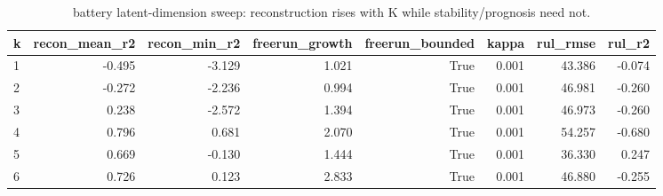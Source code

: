 \begin{table}[t]
\centering
\caption{battery latent-dimension sweep: reconstruction rises with K while stability/prognosis need not.}
\label{tab:battery_ksweep}
\begin{tabular}{lrrrrrrr}
\toprule
k & recon\_mean\_r2 & recon\_min\_r2 & freerun\_growth & freerun\_bounded & kappa & rul\_rmse & rul\_r2 \\
\midrule
1 & -0.495 & -3.129 & 1.021 & True & 0.001 & 43.386 & -0.074 \\
2 & -0.272 & -2.236 & 0.994 & True & 0.001 & 46.981 & -0.260 \\
3 & 0.238 & -2.572 & 1.394 & True & 0.001 & 46.973 & -0.260 \\
4 & 0.796 & 0.681 & 2.070 & True & 0.001 & 54.257 & -0.680 \\
5 & 0.669 & -0.130 & 1.444 & True & 0.001 & 36.330 & 0.247 \\
6 & 0.726 & 0.123 & 2.833 & True & 0.001 & 46.880 & -0.255 \\
\bottomrule
\end{tabular}
\end{table}
